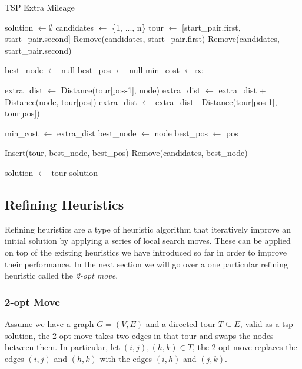 \documentclass{article}
\begin{document}
\newpage

\begin{algorithm}[!ht]
\caption{TSP Extra Mileage}
\begin{algorithmic}[1]
\State solution $\gets \emptyset$
\State candidates $\gets$ \{1, ..., n\} 
\State tour $\gets$ [start\_pair.first, start\_pair.second] 
\State Remove(candidates, start\_pair.first)
\State Remove(candidates, start\_pair.second)

    \State best\_node $\gets$ null
    \State best\_pos $\gets$ null
    \State min\_cost $\gets \infty$

            \State extra\_dist $\gets$ Distance(tour[pos-1], node)
            \State extra\_dist $\gets$ extra\_dist + Distance(node, tour[pos])
            \State extra\_dist $\gets$ extra\_dist - Distance(tour[pos-1], tour[pos])
            
                \State min\_cost $\gets$ extra\_dist
                \State best\_node $\gets$ node
                \State best\_pos $\gets$ pos
            \EndIf
        \EndFor
    \EndFor

    \State Insert(tour, best\_node, best\_pos)
    \State Remove(candidates, best\_node)
\EndWhile

\State solution $\gets$ tour
\State \Return solution
\EndProcedure
\end{algorithmic}
\end{algorithm}

\newpage

\subsection{Refining Heuristics}
Refining heuristics are a type of heuristic algorithm that iteratively improve an initial solution by applying a series of local search moves. These can be applied on top of the existing heuristics we have 
introduced so far in order to improve their performance. In the next section we will go over a one particular refining heuristic called the \textit{2-opt move}\cite{Heuristics_for_the_Traveling_Salesman_Problem}.

\subsubsection{2-opt Move}
Assume we have a graph $G = (V, E)$ and a directed tour $T \subseteq E$, valid as a tsp solution, 
the 2-opt move takes two edges in that tour and swaps the nodes 
between them.  In particular, let $(i, j), (h, k) \in T$, the 2-opt move replaces the edges $(i, j)$ and $(h, k)$ with the edges $(i, h)$ and $(j, k)$. \\
\\
\end{document}
